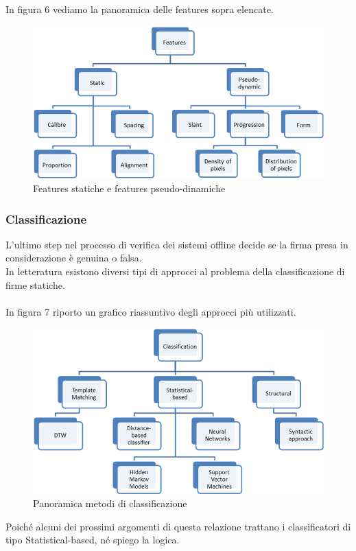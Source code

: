 In figura 6 vediamo la panoramica delle features sopra elencate.
\begin{figure}[H]
\centering
\includegraphics[scale=0.7]{../Logo&Header/featuresStaticPseudoD.png}
\caption{Features statiche e features pseudo-dinamiche}
\end{figure}
\subsubsection*{Classificazione}
\label{2.1.3.2}
L'ultimo step nel processo di verifica dei sistemi offline decide se la firma presa in considerazione è genuina o falsa.\\
In letteratura esistono diversi tipi di approcci al problema della classificazione di firme statiche.\\\\
In figura 7 riporto un grafico riassuntivo degli approcci più utilizzati.\\
\begin{figure}[H]
\centering
\includegraphics[scale=0.7]{../Logo&Header/classificatori.png}
\caption{Panoramica metodi di classificazione}
\end{figure}
Poiché alcuni dei prossimi argomenti di questa relazione trattano i classificatori di tipo Statistical-based, né spiego la logica.
